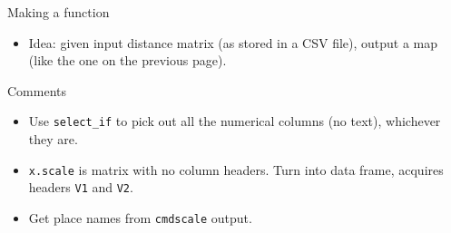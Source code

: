 \documentclass[ignorenonframetext,]{beamer}
\newenvironment{Shaded}{\begin{snugshade}}{\end{snugshade}}
\newcommand{\CommentTok}[1]{\textcolor[rgb]{0.56,0.35,0.01}{\textit{#1}}}
\newcommand{\ControlFlowTok}[1]{\textcolor[rgb]{0.13,0.29,0.53}{\textbf{#1}}}
\newcommand{\DataTypeTok}[1]{\textcolor[rgb]{0.13,0.29,0.53}{#1}}
\newcommand{\KeywordTok}[1]{\textcolor[rgb]{0.13,0.29,0.53}{\textbf{#1}}}
\newcommand{\NormalTok}[1]{#1}
\newcommand{\OperatorTok}[1]{\textcolor[rgb]{0.81,0.36,0.00}{\textbf{#1}}}
\newcommand{\StringTok}[1]{\textcolor[rgb]{0.31,0.60,0.02}{#1}}
\providecommand{\tightlist}{%
  \setlength{\itemsep}{0pt}\setlength{\parskip}{0pt}}
\begin{document}
\begin{frame}[fragile]{Making a function}
\protect\hypertarget{making-a-function}{}

\begin{itemize}
\tightlist
\item
  Idea: given input distance matrix (as stored in a CSV file), output a
  map (like the one on the previous page).
\end{itemize}

\footnotesize

\begin{Shaded}
\end{Shaded}

\normalsize

\end{frame}

\begin{frame}[fragile]{Comments}
\protect\hypertarget{comments-27}{}

\begin{itemize}
\item
  Use \texttt{select\_if} to pick out all the numerical columns (no
  text), whichever they are.
\item
  \texttt{x.scale} is matrix with no column headers. Turn into data
  frame, acquires headers \texttt{V1} and \texttt{V2}.
\item
  Get place names from \texttt{cmdscale} output.
\end{itemize}

\end{frame}
\end{document}
